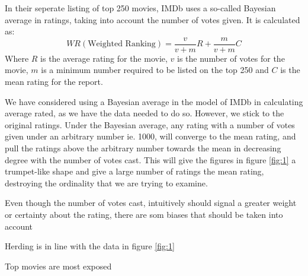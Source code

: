 \documentclass[12pt]{article}
\begin{document}
In their seperate listing of top 250 movies, IMDb uses a so-called Bayesian average in ratings, taking into account the number of votes given. It is calculated as:
$$WR (\text{Weighted Ranking})=\frac{v}{v+m}R+\frac{m}{v+m}C$$
Where $R$ is the average rating for the movie, $v$ is the number of votes for the movie, $m$ is a minimum number required to be listed on the top 250 and $C$ is the mean rating for the report. 

We have considered using a Bayesian average in the model of IMDb in calculating average rated, as we have the data needed to do so. However, we stick to the original ratings. Under the Bayesian average, any rating with a number of votes given under an arbitrary number ie. 1000, will converge to the mean rating, and pull the ratings above the arbitrary number towards the mean in decreasing degree with the number of votes cast. This will give the figures in figure \ref{fig:1} a trumpet-like shape and give a large number of ratings the mean rating, destroying the ordinality that we are trying to examine. 

Even though the number of votes cast, intuitively should signal a greater weight or certainty about the rating, there are som biases that should be taken into account

Herding is in line with the data in figure \ref{fig:1}

Top movies are most exposed
\end{document}
